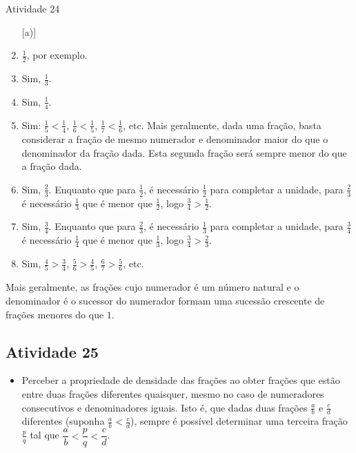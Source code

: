 \begin{multicols}{2}
\begin{resposta*}{Atividade 24}
\begin{enumerate} [\quad a)] %
    \item             $\frac{1}{2}$, por exemplo.
    \item       Sim,       $\frac{1}{3}$.
    \item       Sim,       $\frac{1}{4}$.
    \item       Sim:       $\frac{1}{5} < \frac{1}{4}$,       $\frac{1}{6} <
\frac{1}{5}$,       $\frac{1}{7} < \frac{1}{6}$, etc. Mais geralmente, dada uma
fração, basta considerar a fração de mesmo numerador e denominador maior do que
o denominador da fração dada. Esta segunda fração será sempre menor do que a
fração dada.
    \item       Sim,       $\frac{2}{3}$. Enquanto que para       $\frac{1}{2}$,
é necessário       $\frac{1}{2}$       para completar a unidade, para
$\frac{2}{3}$       é necessário       $\frac{1}{3}$       que é menor que
$\frac{1}{2}$, logo       $\frac{3}{4} > \frac{1}{2}$.
    \item       Sim,       $\frac{3}{4}$. Enquanto que para       $\frac{2}{3}$,
é necessário       $\frac{1}{3}$       para completar a unidade, para
$\frac{3}{4}$       é necessário       $\frac{1}{4}$       que é menor que
$\frac{1}{3}$, logo       $\frac{3}{4} > \frac{2}{3}$.
    \item       Sim,       $\frac{4}{5} > \frac{3}{4}$,       $\frac{5}{6} >
\frac{4}{5}$,       $\frac{6}{7} > \frac{5}{6}$, etc.
\end{enumerate} %

  Mais geralmente, as frações cujo numerador é um número natural e o denominador
é o sucessor do numerador formam uma sucessão crescente de frações menores do
que   $1$.

\end{resposta*}

\end{multicols}

\subsection{Atividade 25}

\begin{itemize} %
    \item       Perceber a propriedade de densidade das frações ao obter frações
que estão entre duas frações diferentes quaisquer, mesmo no caso de numeradores
consecutivos e denominadores iguais. Isto é, que dadas duas frações
$\frac{a}{b}$       e       $\frac{c}{d}$       diferentes (suponha
$\frac{a}{b}<\frac{c}{d}$), sempre é possível determinar uma terceira fração
  $\frac{p}{q}$       tal que       $\dfrac{a}{b}<\dfrac{p}{q}<\dfrac{c}{d}$.
\end{itemize} %


